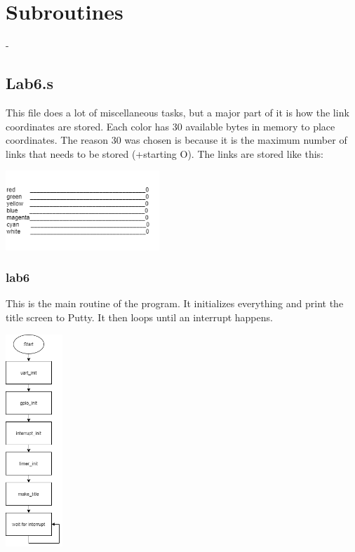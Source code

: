 \documentclass{article}
\begin{document}
\newpage
\section{Subroutines}
-

\subsection{Lab6.s}
    This file does a lot of miscellaneous tasks, but a major part of it
    is how the link coordinates are stored. Each color has 30 available bytes
    in memory to place coordinates. The reason 30 was chosen is because it is 
    the maximum number of links that needs to be stored (+starting O). The links
    are stored like this:
    \begin{center}
        {\includegraphics[height=3cm]{links.png}\centering} 
    \end{center}
    \subsubsection{lab6}
        This is the main routine of the program.  It initializes everything 
        and print the title screen to Putty.  It then loops until an interrupt
        happens.
        \begin{center}
            {\includegraphics[height=8cm]{lab6.png}\centering} 
        \end{center}
        \newpage
\end{document}
